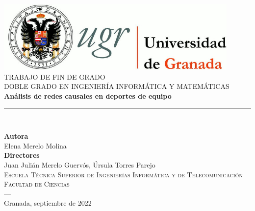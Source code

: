\begin{titlepage}
\newlength{\centeroffset}
\setlength{\centeroffset}{-0.5\oddsidemargin}
\addtolength{\centeroffset}{0.5\evensidemargin}
\thispagestyle{empty}

\noindent\hspace*{\centeroffset}\begin{minipage}{\textwidth}

\centering
\includegraphics[width=0.9\textwidth]{logos/logo_ugr.jpg}\\[1.4cm]

\textsc{ \Large TRABAJO DE FIN DE GRADO\\[0.2cm]}
\textsc{ DOBLE GRADO EN INGENIERÍA INFORMÁTICA Y MATEMÁTICAS}\\[1cm]

{\Huge\bfseries Análisis de redes causales en deportes de equipo \\}
\noindent\rule[-1ex]{\textwidth}{3pt}\\[3.5ex]
\end{minipage}

\vspace{2.5cm}
\noindent\hspace*{\centeroffset}
\begin{minipage}{\textwidth}
\centering

\textbf{Autora}\\ {Elena Merelo Molina}\\[2.5ex]
\textbf{Directores}\\ {Juan Julián Merelo Guervós, Úrsula Torres Parejo}\\[2cm]
\textsc{Escuela Técnica Superior de Ingenierías Informática y de Telecomunicación}\\
\textsc{Facultad de Ciencias}\\
\textsc{---}\\
Granada, septiembre de 2022
\end{minipage}
\end{titlepage}
